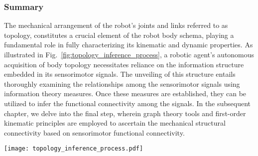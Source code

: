 \subsubsection{Summary}
The mechanical arrangement of the robot's joints and links referred to as topology, constitutes a crucial element of the robot body schema, playing a fundamental role in fully characterizing its kinematic and dynamic properties. As illustrated in Fig.~\ref{fig:topology_inference_process}, a robotic agent's autonomous acquisition of body topology necessitates reliance on the information structure embedded in its sensorimotor signals. The unveiling of this structure entails thoroughly examining the relationships among the sensorimotor signals using information theory measures. Once these measures are established, they can be utilized to infer the functional connectivity among the signals. In the subsequent chapter, we delve into the final step, wherein graph theory tools and first-order kinematic principles are employed to ascertain the mechanical structural connectivity based on sensorimotor functional connectivity.


\begin{figure*}[!t]
	\centering	
	\hspace*{\fill}
	\texttt{[image: topology\_inference\_process.pdf]}
	\hspace*{\fill}	
	\caption[] {\label{fig:topology_inference_process}\textbf{Topology inference process.} Extracting the robot's mechanical topology from the relationships among the sensorimotor signals involves combining tools from information and graph theory to determine the functional connectivity between signals and using it to infer the mechanical structural connectivity.}
\end{figure*}


